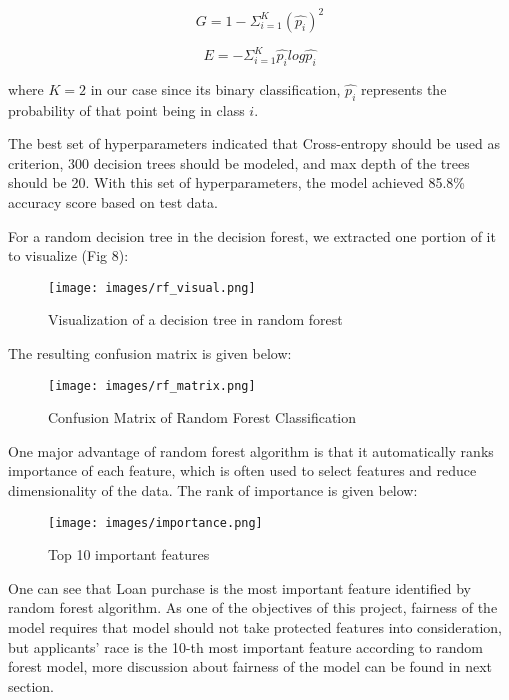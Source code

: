 \documentclass[letterpaper, 10 pt, conference]{ieeeconf}  %
\begin{document}
\begin{equation}
    G = 1-\Sigma_{i=1}^K(\hat{p_i})^2
\end{equation}

\begin{equation}
    E = -\Sigma_{i=1}^K\hat{p_i}log\hat{p_i}
\end{equation}

where $K=2$ in our case since its binary classification, $\hat{p_i}$ represents the probability of that point being in class $i$.

The best set of hyperparameters indicated that Cross-entropy should be used as criterion, 300 decision trees should be modeled, and max depth of the trees should be 20. With this set of hyperparameters, the model achieved 85.8\% accuracy score based on test data.

For a random decision tree in the decision forest, we extracted one portion of it to visualize (Fig 8):

\begin{figure*}
    \centering
    \texttt{[image: images/rf\_visual.png]}
    \caption{Visualization of a decision tree in random forest}
\end{figure*}


The resulting confusion matrix is given below:
\begin{figure}[H]
    \centering
    \texttt{[image: images/rf\_matrix.png]}
    \caption{Confusion Matrix of Random Forest Classification}
\end{figure}
One major advantage of random forest algorithm is that it automatically ranks importance of each feature, which is often used to select features and reduce dimensionality of the data.
The rank of importance is given below:
\begin{figure}[H]
    \centering
    \texttt{[image: images/importance.png]}
    \caption{Top 10 important features}
\end{figure}
One can see that Loan purchase is the most important feature identified by random forest algorithm. As one of the objectives of this project, fairness of the model requires that model should not take protected features into consideration, but applicants' race is the 10-th most important feature according to random forest model, more discussion about fairness of the model can be found in next section.
\end{document}
